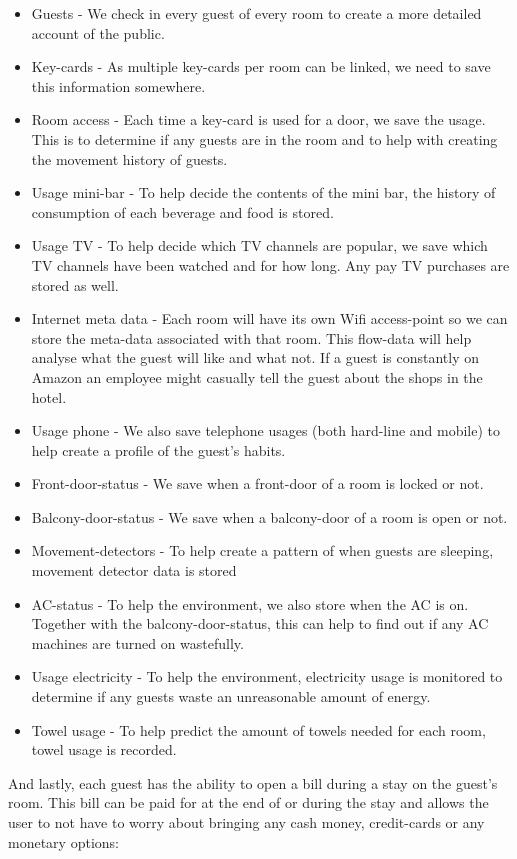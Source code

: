 \begin{itemize}
	\item Guests - We check in every guest of every room to create a more detailed account of the public.
	\item Key-cards - As multiple key-cards per room can be linked, we need to save this information somewhere.
	\item Room access - Each time a key-card is used for a door, we save the usage. This is to determine if any guests are in the room and to help with creating the movement history of guests.
	\item Usage mini-bar - To help decide the contents of the mini bar, the history of consumption of each beverage and food is stored.
	\item Usage TV - To help decide which TV channels are popular, we save which TV channels have been watched and for how long. Any pay TV purchases are stored as well.
	\item Internet meta data - Each room will have its own Wifi access-point so we can store the meta-data associated with that room. This flow-data will help analyse what the guest will like and what not. If a guest is constantly on Amazon an employee might casually tell the guest about the shops in the hotel.
	\item Usage phone - We also save telephone usages (both hard-line and mobile) to help create a profile of the guest's habits.
	\item Front-door-status - We save when a front-door of a room is locked or not.
	\item Balcony-door-status - We save when a balcony-door of a room is open or not.
	\item Movement-detectors - To help create a pattern of when guests are sleeping, movement detector data is stored
	\item AC-status - To help the environment, we also store when the AC is on. Together with the balcony-door-status, this can help to find out if any AC machines are turned on wastefully.
	\item Usage electricity - To help the environment, electricity usage is monitored to determine if any guests waste an unreasonable amount of energy.
	\item Towel usage - To help predict the amount of towels needed for each room, towel usage is recorded. 
\end{itemize}

And lastly, each guest has the ability to open a bill during a stay on the guest's room. This bill can be paid for at the end of or during the stay and allows the user to not have to worry about bringing any cash money, credit-cards or any monetary options:


